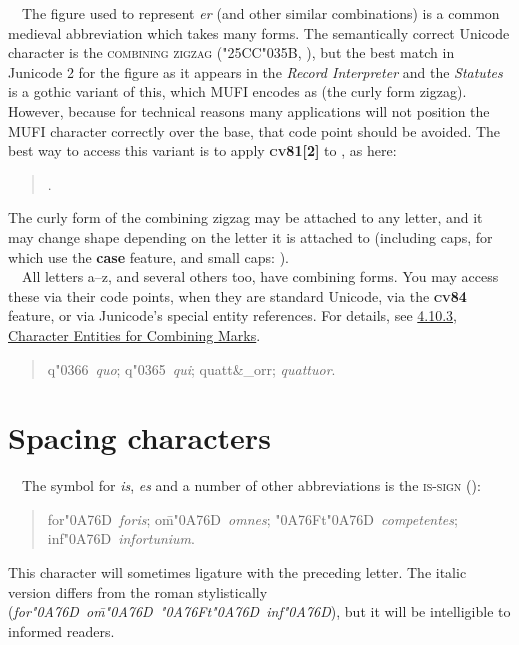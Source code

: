 \noindent{}\ \ The figure used to represent \textit{er\textup{ }}(and other similar combinations) is a common medieval
abbreviation which takes many forms. The semantically correct Unicode character is the \textsc{combining
zigzag} (\char"25CC\char"035B, ), but the best match in Junicode 2 for the figure as it appears in the
\textit{Record Interpreter} and the \textit{Statutes} is a gothic variant of this, which MUFI
encodes as  (the curly form zigzag). However, because for technical reasons many applications will not position
the MUFI character correctly over the base, that code point should be avoided. The best way to access this variant is
to apply \textsc{\textbf{cv81[2]}} to , as here:
\begin{quote}
.
\end{quote}
The curly form of the combining zigzag may be attached to any letter, and it may change shape depending on the letter it
is attached to (including caps, for which use the \textbf{case} feature, and small caps:
).\\[1ex]

\noindent{}\ \ All letters a--z, and several others too, have combining forms.
You may access these via their code points, when they are standard Unicode, via the
\textbf{\textsc{cv84}} feature, or via
Junicode's special entity references. For details, see \hyperlink{ss10}{4.10.3, Character Entities
for Combining Marks}.
\begin{quote}
q\char"0366\ \textit{quo}; q\char"0365\ \textit{qui}; quatt\&\_orr; \textit{quattuor}.
\end{quote}
\section{Spacing characters}
\ \ The symbol for \textit{is}, \textit{es} and a number of other abbreviations is the
\textsc{is-sign} ():
\begin{quote}
for\char"0A76D\ \textit{foris}; o\={m}\char"0A76D\ \textit{omnes}; \char"0A76Ft\char"0A76D\
\textit{competentes}; inf\char"0A76D\ \textit{infortunium}.
\end{quote}
This character will sometimes ligature with the preceding letter. The italic version differs from the roman
stylistically (\textit{for\char"0A76D\ o\={m}\char"0A76D\ \char"0A76Ft\char"0A76D\ inf\char"0A76D}), but it will be
intelligible to informed readers.\\[1ex]

